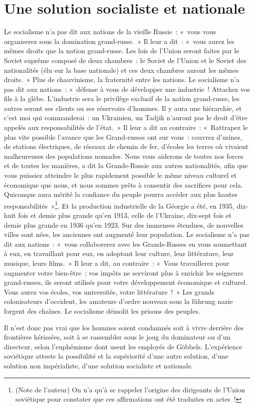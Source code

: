 \documentclass[french,twoside]{book} %
\begin{document}
\section[{Une solution socialiste et nationale}]{Une solution socialiste et nationale}
\noindent Le socialisme n’a pas dit aux nations de la vieille Russie : « vous vous organiserez sous la domination grand-russe. » Il leur a dit : « vous aurez les mêmes droits que la nation grand-russe. Les lois de l’Union seront faites par le Soviet suprême composé de deux chambres : le Soviet de l’Union et le Soviet des nationalités (élu sur la base nationale) et ces deux chambres auront les mêmes droits. » Plus de chauvinisme, la fraternité entre les nations. Le socialisme n’a pas dit aux nations : « défense à vous de développer une industrie ! Attachez vos fils à la glèbe. L’industrie sera le privilège exclusif de la nation grand-russe, les autres seront ses clients ou ses réservoirs d’hommes. Il y aura une hiérarchie, et c’est moi qui commanderai : un Ukrainien, un Tadjik n’auront pas le droit d’être appelés aux responsabilités de l’état. » Il leur a dit au contraire : « Rattrapez le plus vite possible l’avance que les Grand-russes ont sur vous : couvrez d’usines, de stations électriques, de réseaux de chemin de fer, d’écoles les terres où vivaient malheureuses des populations nomades. Nous vous aiderons de toutes nos forces et de toutes les manières, a dit la Grande-Russie aux autres nationalités, afin que vous puissiez atteindre le plus rapidement possible le même niveau culturel et économique que nous, et nous sommes prêts à consentir des sacrifices pour cela. Quiconque aura mérité la confiance du peuple pourra accéder aux plus hautes responsabilités »\footnote{(Note de l’auteur) On n’a qu’à se rappeler l’origine des dirigeants de l’Union soviétique pour constater que ces affirmations ont été traduites en actes !}. Et la production industrielle de la Géorgie a été, en 1935, dix-huit fois et demie plus grande qu’en 1913, celle de l’Ukraine, dix-sept fois et demie plus grande en 1936 qu’en 1923. Sur des immenses étendues, de nouvelles villes sont nées, les anciennes ont augmenté leur population. Le socialisme n’a pas dit aux nations : « vous collaborerez avec les Grands-Russes en vous soumettant à eux, en travaillant pour eux, en adoptant leur culture, leur littérature, leur musique, leurs films. » Il leur a dit, au contraire : « Vous travaillerez pour augmenter votre bien-être ; vos impôts ne serviront plus à enrichir les seigneurs grand-russes, ils seront utilisés pour votre développement économique et culturel. Vous aurez vos écoles, vos universités, votre littérature ! » Les grands colonisateurs d’occident, les amateurs d’ordre nouveau sous la führung nazie forgent des chaînes. Le socialisme démolit les prisons des peuples.\par
Il n’est donc pas vrai que les hommes soient condamnés soit à vivre derrière des frontières hérissées, soit à se rassembler sous le joug du dominateur ou d’un directeur, selon l’euphémisme dont usent les employés de Göbbels. L’expérience soviétique atteste la possibilité et la supériorité d’une autre solution, d’une solution non impérialiste, d’une solution socialiste et nationale.
\end{document}
